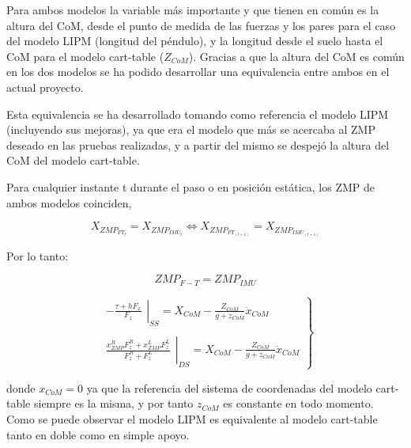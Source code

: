 Para ambos modelos la variable más importante y que tienen en común es la altura del CoM, desde el punto de medida de las fuerzas y los pares para el caso del modelo LIPM (longitud del péndulo), y la longitud desde el suelo hasta el CoM para el modelo cart-table ($Z_{CoM}$). Gracias a que la altura del CoM es común en los dos modelos se ha podido desarrollar una equivalencia entre ambos en el actual proyecto.

Esta equivalencia se ha desarrollado tomando como referencia el modelo LIPM (incluyendo sus mejoras), ya que era el modelo que más se acercaba al ZMP deseado en las pruebas realizadas, y a partir del mismo se despejó la altura del CoM del modelo cart-table. 


Para cualquier instante t durante el paso o en posición estática, los ZMP de ambos modelos coinciden,

\begin{equation}
X_{ZMP_{FT_t}} = X_{ZMP_{IMU_t}} \Leftrightarrow   X_{ZMP_{FT_{(t+1)}}}=X_{ZMP_{IMU_{(t+1)}}}
\label{ec433}
\end{equation}

Por lo tanto:

\begin{equation}
ZMP_{F-T}=ZMP_{IMU}
\label{ec434}
\end{equation}

\begin{equation}
\left.\begin{matrix}
\left.\begin{matrix}
-\frac{\tau+ h F_{x}}{F_{z}}
\end{matrix}\right|_{SS}=X_{CoM}-\frac{Z_{CoM}}{g+\ddot{z}_{CoM}}\ddot{x}_{CoM}
\\ 
\\
\left.\begin{matrix}
\frac{x_{ZMP}^{R}F_{z}^{R}+x_{ZMP}^{L}F_{z}^{L}}{F_{z}^{R}+F_{z}^{L}}
\end{matrix}\right|_{DS}=X_{CoM}-\frac{Z_{CoM}}{g+\ddot{z}_{CoM}}\ddot{x}_{CoM}
\end{matrix}\right\}
\label{ec435}
\end{equation}

donde $x_{CoM}=0$ ya que la referencia del sistema de coordenadas del modelo cart-table siempre es la misma, y por tanto $z_{CoM}$ es constante en todo momento. Como se puede observar el modelo LIPM es equivalente al modelo cart-table tanto en doble como en simple apoyo.

